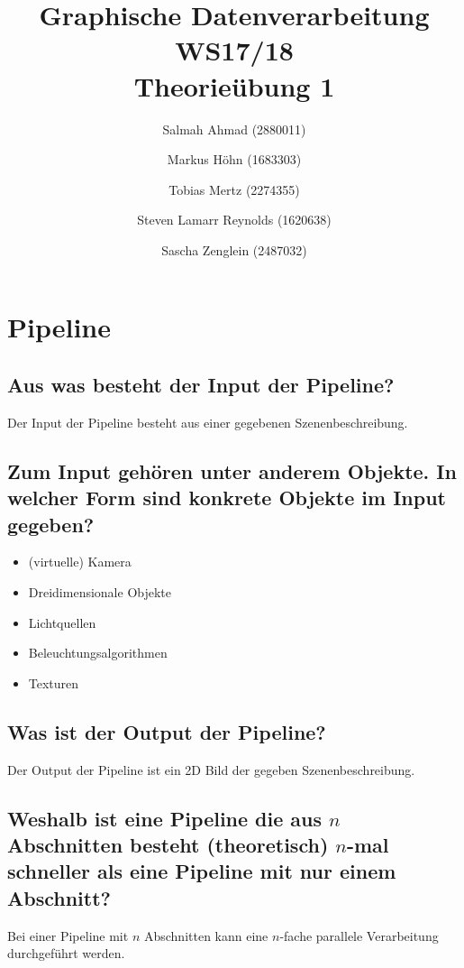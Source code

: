 \documentclass[a4paper,10pt,DIV=14]{scrartcl}
\newcommand{\gqq}[1]{\glqq{}#1\grqq{}}
\begin{document}
\title{Graphische Datenverarbeitung WS17/18 \\ Theorieübung 1}
\author{
  Salmah Ahmad (2880011)
  \and
  Markus Höhn (1683303)
  \and
  Tobias Mertz (2274355)
  \and
  Steven Lamarr Reynolds (1620638)
  \and
  Sascha Zenglein (2487032)
}

\maketitle

\section{Pipeline}

\subsection{Aus was besteht der Input der Pipeline?}
Der Input der Pipeline besteht aus einer gegebenen Szenenbeschreibung.


\subsection{Zum Input gehören unter anderem \gqq{Objekte}. In welcher Form sind konkrete \gqq{Objekte} im Input gegeben?}

\begin{itemize}[itemsep=0pt]
	\item (virtuelle) Kamera
	\item Dreidimensionale Objekte
	\item Lichtquellen
	\item Beleuchtungsalgorithmen
	\item Texturen
\end{itemize}


\subsection{Was ist der Output der Pipeline?}
Der Output der Pipeline ist ein 2D Bild der gegeben Szenenbeschreibung.


\subsection{Weshalb ist eine Pipeline die aus $n$ Abschnitten besteht (theoretisch) $n$-mal schneller als eine Pipeline mit nur einem Abschnitt?}
Bei einer Pipeline mit $n$ Abschnitten kann eine $n$-fache parallele Verarbeitung durchgeführt werden.
\end{document}
